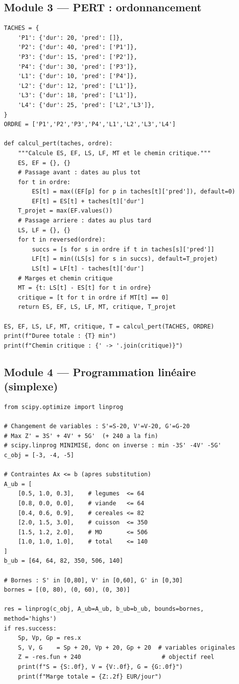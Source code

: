 \documentclass[12pt,a4paper]{article}
\begin{document}
\subsection{Module 3 — PERT : ordonnancement}

\begin{lstlisting}[caption={module\_pert.py}]
TACHES = {
    'P1': {'dur': 20, 'pred': []},
    'P2': {'dur': 40, 'pred': ['P1']},
    'P3': {'dur': 15, 'pred': ['P2']},
    'P4': {'dur': 30, 'pred': ['P3']},
    'L1': {'dur': 10, 'pred': ['P4']},
    'L2': {'dur': 12, 'pred': ['L1']},
    'L3': {'dur': 18, 'pred': ['L1']},
    'L4': {'dur': 25, 'pred': ['L2','L3']},
}
ORDRE = ['P1','P2','P3','P4','L1','L2','L3','L4']

def calcul_pert(taches, ordre):
    """Calcule ES, EF, LS, LF, MT et le chemin critique."""
    ES, EF = {}, {}
    # Passage avant : dates au plus tot
    for t in ordre:
        ES[t] = max((EF[p] for p in taches[t]['pred']), default=0)
        EF[t] = ES[t] + taches[t]['dur']
    T_projet = max(EF.values())
    # Passage arriere : dates au plus tard
    LS, LF = {}, {}
    for t in reversed(ordre):
        succs = [s for s in ordre if t in taches[s]['pred']]
        LF[t] = min((LS[s] for s in succs), default=T_projet)
        LS[t] = LF[t] - taches[t]['dur']
    # Marges et chemin critique
    MT = {t: LS[t] - ES[t] for t in ordre}
    critique = [t for t in ordre if MT[t] == 0]
    return ES, EF, LS, LF, MT, critique, T_projet

ES, EF, LS, LF, MT, critique, T = calcul_pert(TACHES, ORDRE)
print(f"Duree totale : {T} min")
print(f"Chemin critique : {' -> '.join(critique)}")
\end{lstlisting}

\subsection{Module 4 — Programmation linéaire (simplexe)}

\begin{lstlisting}[caption={module\_lp.py}]
from scipy.optimize import linprog

# Changement de variables : S'=S-20, V'=V-20, G'=G-20
# Max Z' = 3S' + 4V' + 5G'  (+ 240 a la fin)
# scipy.linprog MINIMISE, donc on inverse : min -3S' -4V' -5G'
c_obj = [-3, -4, -5]

# Contraintes Ax <= b (apres substitution)
A_ub = [
    [0.5, 1.0, 0.3],    # legumes  <= 64
    [0.8, 0.0, 0.0],    # viande   <= 64
    [0.4, 0.6, 0.9],    # cereales <= 82
    [2.0, 1.5, 3.0],    # cuisson  <= 350
    [1.5, 1.2, 2.0],    # MO       <= 506
    [1.0, 1.0, 1.0],    # total    <= 140
]
b_ub = [64, 64, 82, 350, 506, 140]

# Bornes : S' in [0,80], V' in [0,60], G' in [0,30]
bornes = [(0, 80), (0, 60), (0, 30)]

res = linprog(c_obj, A_ub=A_ub, b_ub=b_ub, bounds=bornes, method='highs')
if res.success:
    Sp, Vp, Gp = res.x
    S, V, G    = Sp + 20, Vp + 20, Gp + 20  # variables originales
    Z = -res.fun + 240                       # objectif reel
    print(f"S = {S:.0f}, V = {V:.0f}, G = {G:.0f}")
    print(f"Marge totale = {Z:.2f} EUR/jour")
\end{lstlisting}
\end{document}
